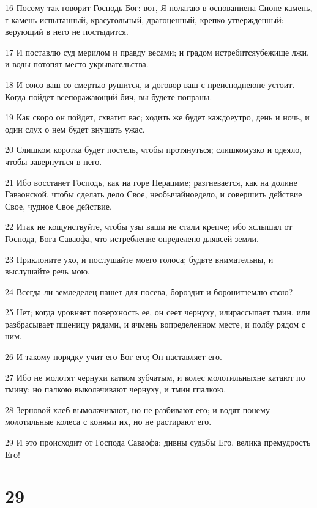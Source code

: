 \par 16 Посему так говорит Господь Бог: вот, Я полагаю в основаниена Сионе камень, г камень испытанный, краеугольный, драгоценный, крепко утвержденный: верующий в него не постыдится.
\par 17 И поставлю суд мерилом и правду весами; и градом истребитсяубежище лжи, и воды потопят место укрывательства.
\par 18 И союз ваш со смертью рушится, и договор ваш с преисподнеюне устоит. Когда пойдет всепоражающий бич, вы будете попраны.
\par 19 Как скоро он пойдет, схватит вас; ходить же будет каждоеутро, день и ночь, и один слух о нем будет внушать ужас.
\par 20 Слишком коротка будет постель, чтобы протянуться; слишкомузко и одеяло, чтобы завернуться в него.
\par 21 Ибо восстанет Господь, как на горе Перациме; разгневается, как на долине Гаваонской, чтобы сделать дело Свое, необычайноедело, и совершить действие Свое, чудное Свое действие.
\par 22 Итак не кощунствуйте, чтобы узы ваши не стали крепче; ибо яслышал от Господа, Бога Саваофа, что истребление определено длявсей земли.
\par 23 Приклоните ухо, и послушайте моего голоса; будьте внимательны, и выслушайте речь мою.
\par 24 Всегда ли земледелец пашет для посева, бороздит и боронитземлю свою?
\par 25 Нет; когда уровняет поверхность ее, он сеет чернуху, илирассыпает тмин, или разбрасывает пшеницу рядами, и ячмень вопределенном месте, и полбу рядом с ним.
\par 26 И такому порядку учит его Бог его; Он наставляет его.
\par 27 Ибо не молотят чернухи катком зубчатым, и колес молотильныхне катают по тмину; но палкою выколачивают чернуху, и тмин гпалкою.
\par 28 Зерновой хлеб вымолачивают, но не разбивают его; и водят понему молотильные колеса с конями их, но не растирают его.
\par 29 И это происходит от Господа Саваофа: дивны судьбы Его, велика премудрость Его!

\chapter{29}

